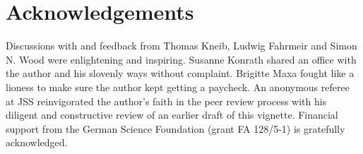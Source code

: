 \documentclass[article, shortnames, nojss, noheadings, notitle]{jss}
\begin{document}
\section*{Acknowledgements}
Discussions with and feedback from Thomas Kneib, Ludwig
Fahrmeir and Simon N. Wood were enlightening and inspiring.
Susanne Konrath shared an office with the author and his slovenly ways without complaint.
Brigitte Maxa fought like a lioness to make sure the author kept getting a paycheck.
An anonymous referee at JSS reinvigorated the author's faith in the peer review process with his diligent and constructive review of an earlier draft of this vignette.
Financial support from the German Science Foundation (grant FA 128/5-1) is gratefully acknowledged.

\newpage

\begin{small}

\end{small}
\end{document}
